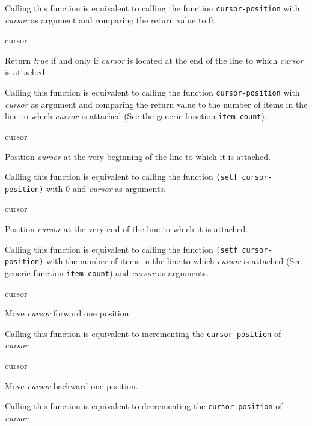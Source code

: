 Calling this function is equivalent to calling the function
\texttt{cursor-position} with \textit{cursor} as argument and
comparing the return value to $0$.  \howeverperformance{}

 {cursor}

Return \textit{true} if and only if \textit{cursor} is located at the
end of the line to which \textit{cursor} is attached.

\ifdetached{}

Calling this function is equivalent to calling the function
\texttt{cursor-position} with \textit{cursor} as argument and
comparing the return value to the number of items in the line to which
\textit{cursor} is attached (See the generic function
\texttt{item-count}).  \howeverperformance{}

 {cursor}

Position \textit{cursor} at the very beginning of the line to which it
is attached.

\ifdetached{}

Calling this function is equivalent to calling the function
\texttt{(setf cursor-position)} with $0$ and \textit{cursor} as
arguments.  \howeverperformance{}

 {cursor}

Position \textit{cursor} at the very end of the line to which it
is attached.

\ifdetached{}

Calling this function is equivalent to calling the function
\texttt{(setf cursor-position)} with the number of items in the line
to which \textit{cursor} is attached (See generic function
\texttt{item-count}) and \textit{cursor} as arguments.
\howeverperformance{}

 {cursor}

Move \textit{cursor} forward one position.

\ifdetached{}

Calling this function is equivalent to incrementing the
\texttt{cursor-position} of \textit{cursor}.  \howeverperformance{}

 {cursor}

Move \textit{cursor} backward one position.

\ifdetached{}

Calling this function is equivalent to decrementing the
\texttt{cursor-position} of \textit{cursor}.  \howeverperformance{}


